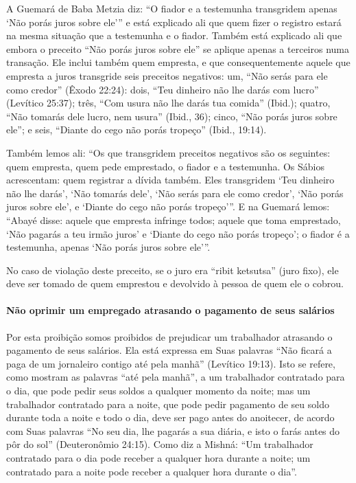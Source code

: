 A Guemará de Baba Metzia diz: ``O fiador e a testemunha transgridem
apenas `Não porás juros sobre ele''' e está explicado ali que quem fizer
o registro estará na mesma situação que a testemunha e o fiador. Também
está explicado ali que embora o preceito ``Não porás juros sobre ele''
se aplique apenas a terceiros numa transação. Ele inclui também quem
empresta, e que consequentemente aquele que empresta a juros transgride
seis preceitos negativos: um, ``Não serás para ele como credor'' (Êxodo
22:24): dois, ``Teu dinheiro não lhe darás com lucro'' (Levítico
25:37); três, ``Com usura não lhe darás tua comida'' (Ibid.); quatro,
``Não tomarás dele lucro, nem usura'' (Ibid., 36); cinco, ``Não porás
juros sobre ele''; e seis, ``Diante do cego não porás tropeço'' (Ibid.,
19:14).

Também lemos ali: ``Os que transgridem preceitos negativos são os
seguintes: quem empresta, quem pede emprestado, o fiador e a testemunha.
Os Sábios acrescentam: quem registrar a dívida também. Eles transgridem
`Teu dinheiro não lhe darás', `Não tomarás dele', `Não serás para ele
como credor', `Não porás juros sobre ele', e `Diante do cego não porás
tropeço'''. E na Guemará lemos: ``Abayé disse: aquele que empresta
infringe todos; aquele que toma emprestado, `Não pagarás a teu irmão
juros' e `Diante do cego não porás tropeço'; o fiador é a testemunha,
apenas `Não porás juros sobre ele'''.

No caso de violação deste preceito, se o juro era ``ribit ketsutsa''
(juro fixo), ele deve ser tomado de quem emprestou e devolvido à pessoa
de quem ele o cobrou.

\paragraph{Não oprimir um empregado atrasando o pagamento de seus salários}

Por esta proibição somos proibidos de prejudicar um trabalhador
atrasando o pagamento de seus salários. Ela está expressa em Suas
palavras ``Não ficará a paga de um jornaleiro contigo até pela manhã''
(Levítico 19:13). Isto se refere, como mostram as palavras ``até pela
manhã'', a um trabalhador contratado para o dia, que pode pedir seus
soldos a qualquer momento da noite; mas um trabalhador contratado para a
noite, que pode pedir pagamento de seu soldo durante toda a noite e todo
o dia, deve ser pago antes do anoitecer, de acordo com Suas palavras
``No seu dia, lhe pagarás a sua diária, e isto o farás antes do pôr do
sol'' (Deuteronômio 24:15). Como diz a Mishná: ``Um trabalhador
contratado para o dia pode receber a qualquer hora durante a noite; um
contratado para a noite pode receber a qualquer hora durante o dia''.

